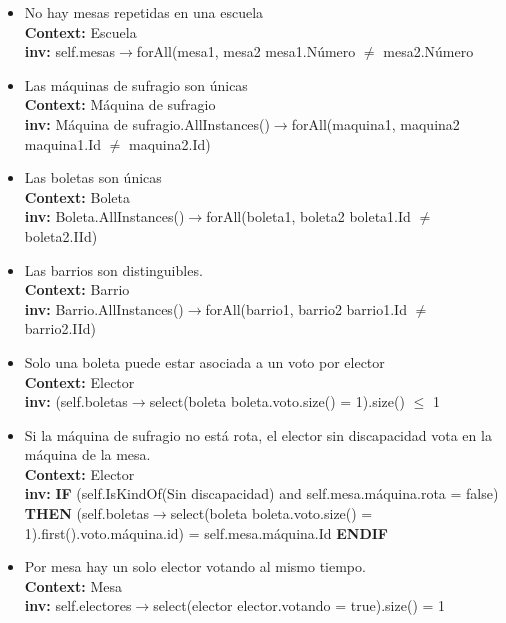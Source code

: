 \documentclass[spanish, 10pt,a4paper]{article}
\numberwithin{equation}{section} %
\begin{document}
\begin{itemize}
	\item No hay mesas repetidas en una escuela
\\	\textbf{Context: }  Escuela
\\	\textbf{inv: } self.mesas$\rightarrow$forAll(mesa1, mesa2 \textbar mesa1.Número $\neq$ mesa2.Número

	\item Las máquinas de sufragio son únicas
\\	\textbf{Context: }  Máquina de sufragio
\\	\textbf{inv: } Máquina de sufragio.AllInstances()$\rightarrow$forAll(maquina1, maquina2 \textbar maquina1.Id $\neq$ maquina2.Id)

	\item Las boletas son únicas
\\	\textbf{Context: }  Boleta
\\	\textbf{inv: } Boleta.AllInstances()$\rightarrow$forAll(boleta1, boleta2 \textbar boleta1.Id $\neq$ boleta2.IId)

	\item Las barrios son distinguibles.
\\	\textbf{Context: }  Barrio
\\	\textbf{inv: } Barrio.AllInstances()$\rightarrow$forAll(barrio1, barrio2 \textbar barrio1.Id $\neq$ barrio2.IId)

	\item Solo una boleta puede estar asociada a un voto por elector
\\	\textbf{Context: }  Elector
\\	\textbf{inv: } (self.boletas$\rightarrow$select(boleta \textbar boleta.voto.size() = 1).size()  $\leq$ 1

	\item Si la máquina de sufragio no está rota, el elector sin discapacidad vota en la máquina de la mesa.
\\	\textbf{Context: }  Elector
\\	\textbf{inv: } \textbf{IF} (self.IsKindOf(Sin discapacidad) and self.mesa.máquina.rota = false) \textbf{THEN} (self.boletas$\rightarrow$select(boleta \textbar boleta.voto.size() = 1).first().voto.máquina.id) = self.mesa.máquina.Id \textbf{ENDIF}

	\item Por mesa hay un solo elector votando al mismo tiempo.
\\	\textbf{Context: }  Mesa
\\	\textbf{inv: } self.electores$\rightarrow$select(elector \textbar elector.votando = true).size() = 1

\end{itemize}
\end{document}
